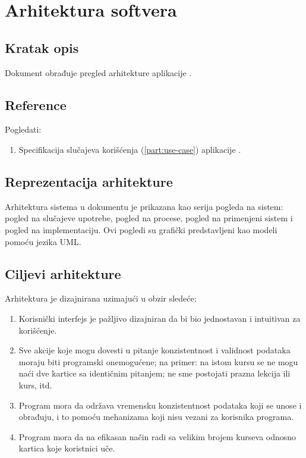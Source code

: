 \part{Arhitektura softvera}

\chapter{Kratak opis}
Dokument obrađuje pregled arhitekture aplikacije \UpamtiOnline.

\chapter{Reference}
Pogledati:
\begin{enumerate}
  \item Specifikacija slučajeva korišćenja (\ref{part:use-case}) aplikacije \UpmatiOnline.
\end{enumerate}

\chapter{Reprezentacija arhitekture}
Arhitektura sistema u dokumentu je prikazana kao serija pogleda na sistem:
pogled na slučajeve upotrebe, pogled na procese, pogled na primenjeni sistem i pogled na implementaciju.
Ovi pogledi su grafički predstavljeni kao modeli pomoću jezika UML.

\chapter{Ciljevi arhitekture}

Arhitektura je dizajnirana uzimajući u obzir sledeće:
\begin{enumerate}
  \item Korisnički interfejs je pažljivo dizajniran da bi bio jednostavan i intuitivan za korišćenje.
  \item Sve akcije koje mogu dovesti u pitanje konzistentnost i validnost podataka moraju biti programski onemogućene; na primer: na istom kursu se ne mogu naći dve kartice sa identičnim pitanjem; ne sme postojati prazna lekcija ili kurs, itd.
  \item Program mora da održava vremensku konzistentnost podataka koji se unose i obrađuju, i to pomoću mehanizama koji nisu vezani za korisnika programa.
  \item Program mora da na efikasan način radi sa velikim brojem kurseva odnosno kartica koje koristnici uče.
\end{enumerate}

